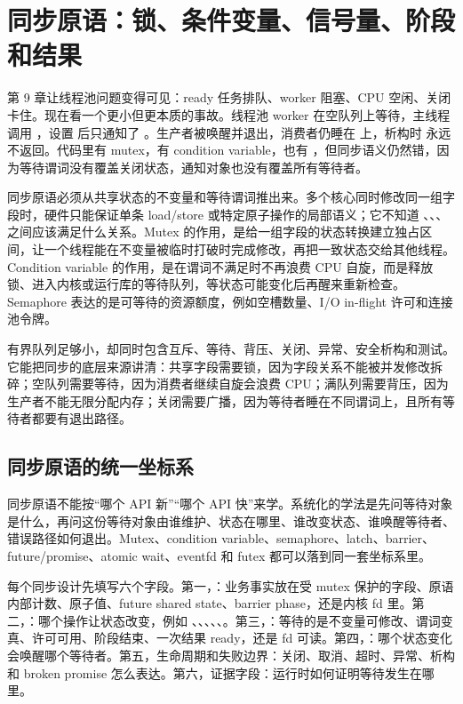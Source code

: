 \chapter{同步原语：锁、条件变量、信号量、阶段和结果}

第 9 章让线程池问题变得可见：ready 任务排队、worker 阻塞、CPU 空闲、关闭卡住。现在看一个更小但更本质的事故。线程池 worker 在空队列上等待，主线程调用 ，设置  后只通知了 。生产者被唤醒并退出，消费者仍睡在  上，析构时  永远不返回。代码里有 mutex，有 condition variable，也有 ，但同步语义仍然错，因为等待谓词没有覆盖关闭状态，通知对象也没有覆盖所有等待者。

同步原语必须从共享状态的不变量和等待谓词推出来。多个核心同时修改同一组字段时，硬件只能保证单条 load/store 或特定原子操作的局部语义；它不知道 、、、 之间应该满足什么关系。Mutex 的作用，是给一组字段的状态转换建立独占区间，让一个线程能在不变量被临时打破时完成修改，再把一致状态交给其他线程。Condition variable 的作用，是在谓词不满足时不再浪费 CPU 自旋，而是释放锁、进入内核或运行库的等待队列，等状态可能变化后再醒来重新检查。Semaphore 表达的是可等待的资源额度，例如空槽数量、I/O in-flight 许可和连接池令牌。

有界队列足够小，却同时包含互斥、等待、背压、关闭、异常、安全析构和测试。它能把同步的底层来源讲清：共享字段需要锁，因为字段关系不能被并发修改拆碎；空队列需要等待，因为消费者继续自旋会浪费 CPU；满队列需要背压，因为生产者不能无限分配内存；关闭需要广播，因为等待者睡在不同谓词上，且所有等待者都要有退出路径。

\section{同步原语的统一坐标系}

同步原语不能按“哪个 API 新”“哪个 API 快”来学。系统化的学法是先问等待对象是什么，再问这份等待对象由谁维护、状态在哪里、谁改变状态、谁唤醒等待者、错误路径如何退出。Mutex、condition variable、semaphore、latch、barrier、future/promise、atomic wait、eventfd 和 futex 都可以落到同一套坐标系里。

每个同步设计先填写六个字段。第一，：业务事实放在受 mutex 保护的字段、原语内部计数、原子值、future shared state、barrier phase，还是内核 fd 里。第二，：哪个操作让状态改变，例如 、、、、、。第三，：等待的是不变量可修改、谓词变真、许可可用、阶段结束、一次结果 ready，还是 fd 可读。第四，：哪个状态变化会唤醒哪个等待者。第五，生命周期和失败边界：关闭、取消、超时、异常、析构和 broken promise 怎么表达。第六，证据字段：运行时如何证明等待发生在哪里。

